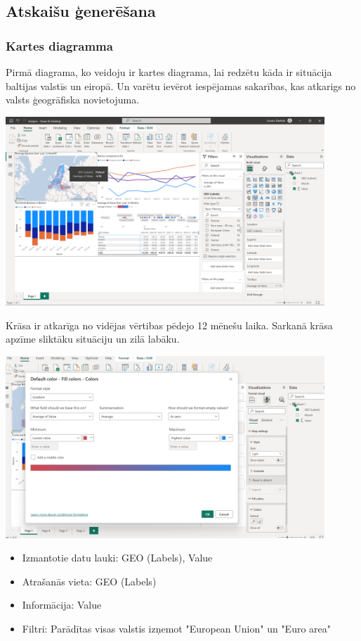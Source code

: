 \documentclass{article}
\begin{document}
\subsection{Atskaišu ģenerēšana}
\subsubsection{Kartes diagramma}
Pirmā diagrama, ko veidoju ir kartes diagrama, lai redzētu kāda ir situācija baltijas valstīs un eiropā. Un varētu ievērot iespējamas sakarības, kas atkarigs no valsts ģeogrāfiska novietojuma.

\includegraphics[width=0.9\textwidth, center]{Map}

Krāsa ir atkarīga no vidējas vērtibas pēdejo 12 mēnešu laika. Sarkanā krāsa apzīme sliktāku situāciju un zilā labāku.

\includegraphics[width=0.9\textwidth, center]{Color}

\begin{itemize}
    \item Izmantotie datu lauki: GEO (Labels), Value
    \item Atrašanās vieta: GEO (Labels)
    \item Informācija: Value
    \item Filtri: Parādītas visas valstis izņemot "European Union" un "Euro area"
\end{itemize}
\end{document}
